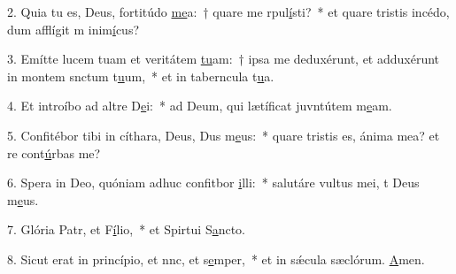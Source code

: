 2. Quia tu es, Deus, fortitúdo \uline{me}a:~† quare me rpul\uline{í}sti?~* et quare tristis incédo, dum afflígit m inim\uline{í}cus?\par 
3. Emítte lucem tuam et veritátem \uline{tu}am:~† ipsa me deduxérunt, et adduxérunt in montem snctum t\uline{u}um,~* et in taberncula t\uline{u}a.\par 
4. Et introíbo ad altre D\uline{e}i:~* ad Deum, qui lætíficat juvntútem m\uline{e}am.\par 
5. Confitébor tibi in cíthara, Deus, Dus m\uline{e}us:~* quare tristis es, ánima mea? et re cont\uline{ú}rbas me?\par 
6. Spera in Deo, quóniam adhuc confitbor \uline{i}lli:~* salutáre vultus mei, t Deus m\uline{e}us.\par 
7. Glória Patr, et F\uline{í}lio,~* et Spirtui S\uline{a}ncto.\par 
8. Sicut erat in princípio, et nnc, et s\uline{e}mper,~* et in sǽcula sæclórum. \uline{A}men.\par 
